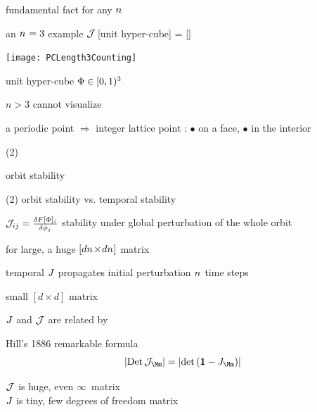 \begin{frame}{fundamental fact for any ${n_{}}$}

    \begin{block}{an ${n_{}}=3$ example} %
${\cal J}\,$[unit hyper-cube] = [{\fundPip}]
\begin{center}
            \begin{minipage}[c]{0.32\textwidth}\begin{center}
\texttt{[image: PCLength3Counting]}
            \end{center}\end{minipage}
            \hspace{2ex}
            \begin{minipage}[c]{0.46\textwidth}
unit hyper-cube $\Phi\in[0,1)^3$
\bigskip\bigskip

{\footnotesize $n>3$ cannot visualize}
            \end{minipage}
\end{center}
    \end{block}
    {\footnotesize
a periodic point $\Rightarrow$ integer lattice point :
{\color{red}$\bullet$} on a face,
{\color{blue}$\bullet$} in the interior
    }
\end{frame} %

\begin{frame}{(2)}
\vfill
\begin{center}
{\huge orbit stability}
\end{center}
\vfill
\end{frame} %

\begin{frame}{(2) orbit stability vs. temporal stability}
\begin{block}{\jacobianOrb}
\(
{\cal J}_{ij} =\frac{\delta F[\Phi]_i}{\delta \phi_j}
\)
stability under {\color{blue}global} perturbation of the whole orbit

\hfill for \cl{} large, a huge $[d{n_{}}\!\times\!d{n_{}}]$ matrix
\end{block}
\begin{block}{temporal {\jacobianM}}
\(
\jMps%
\)
propagates {\color{blue}initial} perturbation ${n_{}}$ time steps

\hfill small $[d\!\times\!d]$ matrix
\end{block}
\vfill

$J$ and ${\cal J}$ are related by
\begin{block}{Hill's 1886 remarkable formula}
\[
|\Det\jMorb_\Mm| = |\det(\matId - \jMps_\Mm)|
\]
\end{block}
${\cal J}$ is {\color{red}huge}, even $\infty$\dmn\ matrix\\
$J$ is {\color{red}tiny}, few degrees of freedom matrix
\end{frame} %

